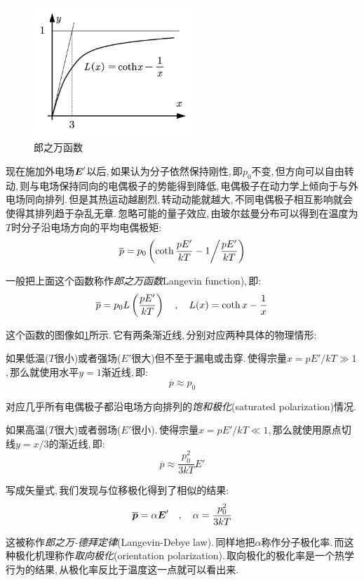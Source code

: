 \begin{figure}
\vspace{-0.2cm}
\centering
\includegraphics[width=6cm]{image/7-2-11.png}
\caption{郎之万函数}\label{fig7-2-11}
\end{figure}
现在施加外电场$\boldsymbol{E}'$以后,\,如果认为分子依然保持刚性,\,即$p_0$不变,\,但方向可以自由转动,\,则与电场保持同向的电偶极子的势能得到降低,\,电偶极子在动力学上倾向于与外电场同向排列.\,但是其热运动越剧烈,\,转动动能就越大,\,不同电偶极子相互影响就会使得其排列趋于杂乱无章.\,忽略可能的量子效应,\,由玻尔兹曼分布可以得到在温度为$T$时分子沿电场方向的平均电偶极矩:
\[\overline{p}=p_0\left({\rm coth}\,\frac{pE'}{kT}-1\middle/\frac{pE'}{kT}\right)\]

一般把上面这个函数称作\emph{郎之万函数}Langevin function),\,即:
\[\overline{p}=p_0 L\left(\frac{pE'}{kT}\right)\quad,\quad L(x)={\rm coth}\,x-\frac{1}{x}\]

这个函数的图像如\ref{fig7-2-11}所示.\,它有两条渐近线,\,分别对应两种具体的物理情形:

如果低温($T$很小)或者强场($E'$很大)但不至于漏电或击穿.\,使得宗量$x=pE'/kT\gg 1$,\,那么就使用水平$y=1$渐近线,\,即:
\[\overline{p}\approx p_0\]

对应几乎所有电偶极子都沿电场方向排列的\emph{饱和极化}(saturated polarization)情况.

如果高温($T$很大)或者弱场($E'$很小).\,使得宗量$x=pE'/kT\ll 1$,\,那么就使用原点切线$y=x/3$的渐近线,\,即:
\[\overline{p}\approx \frac{p_0^2}{3kT}E'\]

写成矢量式,\,我们发现与位移极化得到了相似的结果:
\[\overline{\boldsymbol{p}}=\alpha \boldsymbol{E}'\quad,\quad \alpha =\frac{p_0^2}{3kT}\]

这被称作\emph{郎之万-德拜定律}(Langevin-Debye law).\,同样地把$\alpha$称作分子极化率.\,而这种极化机理称作\emph{取向极化}(orientation polarization).\,取向极化的极化率是一个热学行为的结果,\,从极化率反比于温度这一点就可以看出来.

\vspace{1.5cm}

